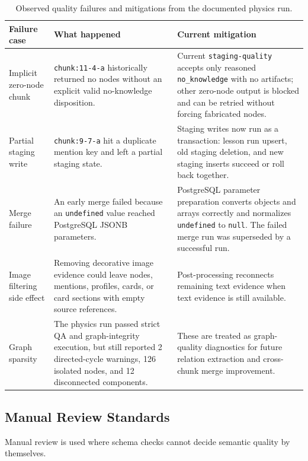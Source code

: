 \documentclass[11pt,letterpaper]{article}
\newcommand{\code}[1]{\nolinkurl{#1}}
\begin{document}
\begin{table}[H]
\centering
\small
\begin{tabularx}{\textwidth}{@{}P{0.24\textwidth}YP{0.27\textwidth}@{}}
\toprule
Failure case & What happened & Current mitigation\\
\midrule
Implicit zero-node chunk & \code{chunk:11-4-a} historically returned no nodes without an explicit valid no-knowledge disposition. & Current \code{staging-quality} accepts only reasoned \code{no_knowledge} with no artifacts; other zero-node output is blocked and can be retried without forcing fabricated nodes.\\
Partial staging write & \code{chunk:9-7-a} hit a duplicate mention key and left a partial staging state. & Staging writes now run as a transaction: lesson run upsert, old staging deletion, and new staging inserts succeed or roll back together.\\
Merge failure & An early merge failed because an \code{undefined} value reached PostgreSQL JSONB parameters. & PostgreSQL parameter preparation converts objects and arrays correctly and normalizes \code{undefined} to \code{null}. The failed merge run was superseded by a successful run.\\
Image filtering side effect & Removing decorative image evidence could leave nodes, mentions, profiles, cards, or card sections with empty source references. & Post-processing reconnects remaining text evidence when text evidence is still available.\\
Graph sparsity & The physics run passed strict QA and graph-integrity execution, but still reported 2 directed-cycle warnings, 126 isolated nodes, and 12 disconnected components. & These are treated as graph-quality diagnostics for future relation extraction and cross-chunk merge improvement.\\
\bottomrule
\end{tabularx}
\caption{Observed quality failures and mitigations from the documented physics run.}
\label{tab:observed-failures}
\end{table}

\subsection{Manual Review Standards}

Manual review is used where schema checks cannot decide semantic quality by themselves.
\end{document}
